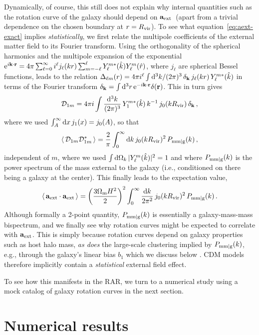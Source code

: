 \documentclass[usenatbib]{mnras}
\newcommand{\aext}{\ensuremath{\mathbf{a}_{\rm ext}}}
\newcommand{\avg}[1]{\ensuremath{\left\langle \,#1\, \right\rangle}}
\newcommand{\e}[1]{\ensuremath{{\rm e}^{#1}}}
\newcommand{\der}{\ensuremath{{\rm d}}}
\newcommand{\eqn}[1]{equation~\eqref{#1}}
\newcommand{\be}{\begin{equation}}
\newcommand{\ee}{\end{equation}}
\newcommand{\Cal}[1]{\ensuremath{\mathcal{#1}}}
\begin{document}
Dynamically, of course, this still does not explain why internal quantities such as the rotation curve of the galaxy should  depend on \aext\ (apart from a trivial dependence on the chosen boundary at $r=R_{\rm vir}$).
To see what \eqn{eq:aext-exact} implies \emph{statistically}, we first relate the multipole coefficients of the external matter field to its Fourier transform. Using the orthogonality of the spherical harmonics and the multipole expansion of the exponential $\e{i\mathbf{k}\cdot\mathbf{r}}=4\pi\sum_{\ell=0}^\infty i^\ell j_\ell(kr)\sum_{m=-\ell}^\ell Y^{m\ast}_\ell(\hat k)Y^m_\ell(\hat r)$, where $j_\ell$ are spherical Bessel functions, leads to the relation $\Delta_{\ell m}(r)=4\pi i^\ell\int\der^3k/(2\pi)^3\,\delta_{\mathbf{k}}\,j_\ell(kr)\,Y^{m\ast}_\ell(\hat k)$ in terms of the Fourier transform $\delta_{\mathbf{k}}=\int\der^3r\,\e{-i\mathbf{k}\cdot\mathbf{r}}\delta(\mathbf{r})$. This in turn gives
\be
\Cal{D}_{1m} = 4\pi  i\int\frac{\der^3k}{(2\pi)^3}\,Y^{m\ast}_1(\hat k)\,k^{-1}\,j_0(kR_{\rm vir})\,\delta_{\mathbf{k}}\,,
\ee
where we used $\int_A^\infty\der x\,j_1(x)=j_0(A)$, so that 
\be
\avg{\Cal{D}_{1m}\Cal{D}_{1m}^\ast} = \frac2\pi\int_0^\infty\der k\,j_0(kR_{\rm vir})^2\,P_{\rm mm|g}(k)\,,
\ee
independent of $m$, where we used $\int\der\Omega_k\,|Y^m_\ell(\hat k)|^2=1$ and where $P_{\rm mm|g}(k)$ is the power spectrum of the mass external to the galaxy (i.e., conditioned on there being a galaxy at the center). This finally leads to the expectation value,
\be
\avg{\aext\cdot\aext} = \left(\frac{3\Omega_{\rm m}H^2}{2}\right)^2\int_0^\infty\frac{\der k}{2\pi^2}\,j_0(kR_{\rm vir})^2\,P_{\rm mm|g}(k)\,.
\label{eq:<aext^2>-exact}
\ee
%
Although formally a 2-point quantity, $P_{\rm mm|g}(k)$ is essentially a galaxy-mass-mass bispectrum, and we finally see why rotation curves might be expected to correlate with \aext. This is simply because rotation curves depend on galaxy properties such as host halo mass, \emph{as does} the large-scale clustering implied by $P_{\rm mm|g}(k)$, e.g., through the galaxy's linear bias $b_1$ which we discuss below \citep[see][for a review]{djs18}. CDM models therefore implicitly contain a \emph{statistical} external field effect.


To see how this manifests in the RAR, we turn to a numerical study using a mock catalog of galaxy rotation curves in the next section.

\section{Numerical results}
\label{sec:numerical}
%
\end{document}
